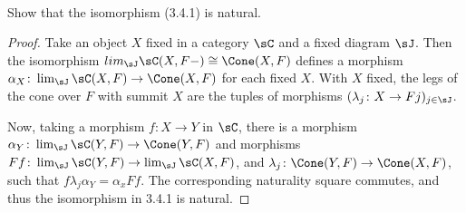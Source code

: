 \documentclass[main.tex]{subfiles}
\begin{document}
\paragraph{}
\begin{exercise}
Show that the isomorphism (3.4.1) is natural.
\end{exercise}


\begin{proof}
Take an object $X$ fixed in a category $\sC$ and a fixed diagram $\sJ$. Then
the isomorphism $lim_\sJ\sC(X,F-)\cong \Cone (X,F)$ defines a morphism $\alpha_X
\colon \lim_\sJ \sC(X,F) \rightarrow \Cone(X,F)$ for each fixed $X$. With $X$ fixed,
the legs of the cone over $F$ with summit $X$ are the tuples of morphisms
$(\lambda_j \colon X \rightarrow Fj)_{j \in \sJ}$. 

Now, taking a morphism $f\colon X \rightarrow Y$ in $\sC$, there is a morphism
$\alpha_Y\colon \lim_\sJ\sC(Y,F) \rightarrow \Cone(Y,F)$ and morphisms $Ff \colon \lim_\sJ \sC(Y, F)
\rightarrow \lim_\sJ \sC(X,F)$, and $\lambda_j \colon \Cone(Y,F) \rightarrow \Cone(X,F)$,
such that $f\lambda_j\alpha_Y = \alpha_xFf$. The corresponding naturality
square commutes, and thus the isomorphism in 3.4.1 is natural. 

	
\end{proof}	
	
\end{document}

